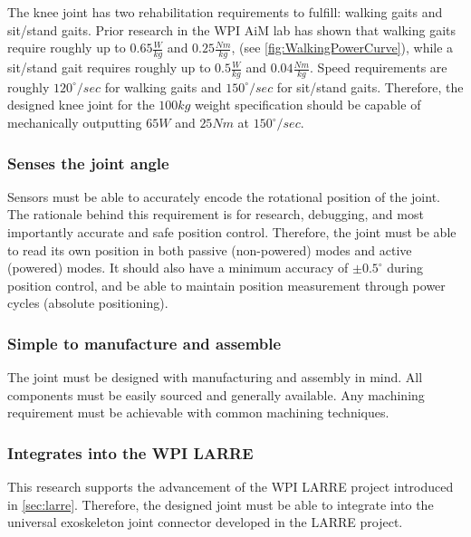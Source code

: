 The knee joint has two rehabilitation requirements to fulfill: walking gaits and sit/stand gaits. Prior research in the WPI AiM lab \cite{SpringWrapClutchKnee} has shown that walking gaits require roughly up to \(0.65 \frac{W}{kg}\) and \(0.25\frac{Nm}{kg}\), (see \autoref{fig:WalkingPowerCurve}), while a sit/stand gait requires roughly up to \(0.5 \frac{W}{kg}\) and \(0.04 \frac{Nm}{kg}\).  Speed requirements are roughly \(120^\circ/sec\) for walking gaits and \(150^\circ/sec\) for sit/stand gaits. Therefore, the designed knee joint for the \(100 kg\) weight specification should be capable of mechanically outputting \(65 W\) and \(25 Nm\) at \(150^\circ/sec\).

\subsubsection{Senses the joint angle}
Sensors must be able to accurately encode the rotational position of the joint. The rationale behind this requirement is for research, debugging, and most importantly accurate and safe position control. Therefore, the joint must be able to read its own position in both passive (non-powered) modes and active (powered) modes. It should also have a minimum accuracy of \(\pm0.5^\circ\) during position control, and be able to maintain position measurement through power cycles (absolute positioning).

\subsubsection{Simple to manufacture and assemble}
The joint must be designed with manufacturing and assembly in mind. All components must be easily sourced and generally available. Any machining requirement must be achievable with common machining techniques.

\subsubsection{Integrates into the WPI LARRE}
This research supports the advancement of the WPI LARRE project introduced in \autoref{sec:larre}. Therefore, the designed joint must be able to integrate into the universal exoskeleton joint connector developed in the LARRE project.